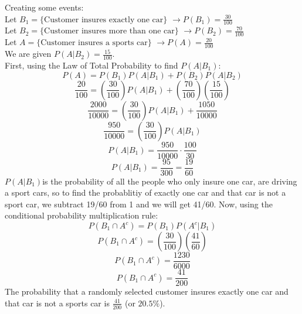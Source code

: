 \documentclass[12pt]{article}
\begin{document}
\begin{enumerate}
Creating some events:\\Let $B_1 = \{\text{Customer insures exactly one car}\}$ $\rightarrow P(B_1) = \frac{30}{100}$\\Let $B_2 = \{\text{Customer insures more than one car}\}$ $\rightarrow P(B_2) = \frac{70}{100}$\\Let $A = \{\text{Customer insures a sports car}\}$ $\rightarrow P(A) = \frac{20}{100}$\\We are given $P(A|B_2) = \frac{15}{100}$.\\First, using the Law of Total Probability to find $P(A|B_1)$:$$P(A) = P(B_1)P(A|B_1) + P(B_2)P(A|B_2)$$$$\frac{20}{100} = \left(\frac{30}{100}\right)P(A|B_1) + \left(\frac{70}{100}\right)\left(\frac{15}{100}\right)$$$$\frac{2000}{10000} = \left(\frac{30}{100}\right)P(A|B_1) + \frac{1050}{10000}$$$$\frac{950}{10000} = \left(\frac{30}{100}\right)P(A|B_1)$$$$P(A|B_1) = \frac{950}{10000} \cdot \frac{100}{30}$$$$P(A|B_1) = \frac{95}{300} = \frac{19}{60}$$
$P(A|B_1)$is the probability of all the people who only insure one car, are driving a sport cars, so to find the probablitiy of exactly one car and that car is not a sport car, we subtract 19/60 from 1 and we will get 41/60.
Now, using the conditional probability multiplication rule:$$P(B_1 \cap A^c) = P(B_1)P(A^c|B_1)$$$$P(B_1 \cap A^c) = \left(\frac{30}{100}\right)\left(\frac{41}{60}\right)$$$$P(B_1 \cap A^c) = \frac{1230}{6000}$$$$P(B_1 \cap A^c) = \frac{41}{200}$$The probability that a randomly selected customer insures exactly one car and that car is not a sports car is $\frac{41}{200}$ (or $20.5\%$).


\end{enumerate}
\end{document}

